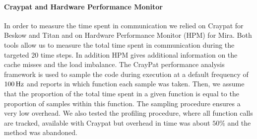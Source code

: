 \documentclass{sig-alternate}
\begin{document}
\paragraph{Craypat and Hardware Performance Monitor}
In order to measure the time spent in communication we relied on Craypat for
Beskow and Titan and on Hardware Performance Monitor (HPM) for Mira. Both tools
allow us to measure the total time spent in communication during the targeted 20 time
steps. In addition HPM gives additional information on the cache misses and the load
imbalance. The CrayPat performance analysis framework is used to sample the code during execution at a default frequency of $\unit[100]{Hz}$ and reports in which function each sample was taken. Then, we assume that the proportion of the total time spent in a given function is equal to the proportion of samples within this function. The sampling procedure ensures a very low overhead. We also tested the profiling procedure, where all function calls are tracked, available with Craypat but overhead in time was about $50\%$ and the method was abandoned.





\end{document}
